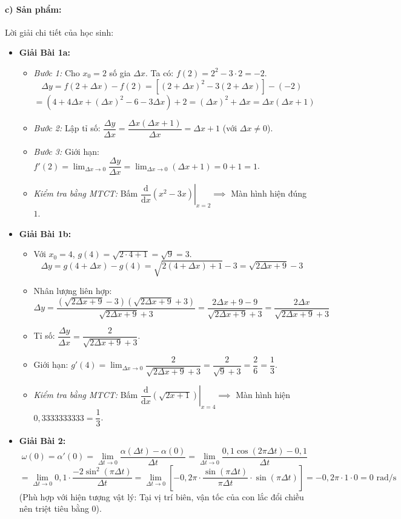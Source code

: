 \documentclass[12pt, a4paper]{article}
\begin{document}
\paragraph{c) Sản phẩm:} Lời giải chi tiết của học sinh:
\begin{itemize}[leftmargin=0.8cm]
    \item \textbf{Giải Bài 1a:}
    \begin{itemize}[leftmargin=0.4cm]
        \item \textit{Bước 1:} Cho $x_0 = 2$ số gia $\Delta x$. Ta có: $f(2) = 2^2 - 3 \cdot 2 = -2$.
        $$\Delta y = f(2 + \Delta x) - f(2) = \left[ (2 + \Delta x)^2 - 3(2 + \Delta x) \right] - (-2)$$
        $$= (4 + 4\Delta x + (\Delta x)^2 - 6 - 3\Delta x) + 2 = (\Delta x)^2 + \Delta x = \Delta x (\Delta x + 1)$$
        \item \textit{Bước 2:} Lập tỉ số: $\dfrac{\Delta y}{\Delta x} = \dfrac{\Delta x (\Delta x + 1)}{\Delta x} = \Delta x + 1$ (với $\Delta x \neq 0$).
        \item \textit{Bước 3:} Giới hạn: $f'(2) = \lim_{\Delta x \to 0} \dfrac{\Delta y}{\Delta x} = \lim_{\Delta x \to 0} (\Delta x + 1) = 0 + 1 = 1$.
        \item \textit{Kiểm tra bằng MTCT:} Bấm $\left. \dfrac{\mathrm{d}}{\mathrm{d}x} (x^2 - 3x) \right|_{x=2} \implies$ Màn hình hiện đúng $1$.
    \end{itemize}
    \item \textbf{Giải Bài 1b:}
    \begin{itemize}[leftmargin=0.4cm]
        \item Với $x_0 = 4$, $g(4) = \sqrt{2 \cdot 4 + 1} = \sqrt{9} = 3$.
        $$\Delta y = g(4 + \Delta x) - g(4) = \sqrt{2(4 + \Delta x) + 1} - 3 = \sqrt{2\Delta x + 9} - 3$$
        \item Nhân lượng liên hợp:
        $$\Delta y = \dfrac{(\sqrt{2\Delta x + 9} - 3)(\sqrt{2\Delta x + 9} + 3)}{\sqrt{2\Delta x + 9} + 3} = \dfrac{2\Delta x + 9 - 9}{\sqrt{2\Delta x + 9} + 3} = \dfrac{2\Delta x}{\sqrt{2\Delta x + 9} + 3}$$
        \item Tỉ số: $\dfrac{\Delta y}{\Delta x} = \dfrac{2}{\sqrt{2\Delta x + 9} + 3}$.
        \item Giới hạn: $g'(4) = \lim_{\Delta x \to 0} \dfrac{2}{\sqrt{2\Delta x + 9} + 3} = \dfrac{2}{\sqrt{9} + 3} = \dfrac{2}{6} = \dfrac{1}{3}$.
        \item \textit{Kiểm tra bằng MTCT:} Bấm $\left. \dfrac{\mathrm{d}}{\mathrm{d}x} (\sqrt{2x+1}) \right|_{x=4} \implies$ Màn hình hiện $0{,}3333333333 = \dfrac{1}{3}$.
    \end{itemize}
    \item \textbf{Giải Bài 2:}
    $$\omega(0) = \alpha'(0) = \lim_{\Delta t \to 0} \dfrac{\alpha(\Delta t) - \alpha(0)}{\Delta t} = \lim_{\Delta t \to 0} \dfrac{0{,}1 \cos(2\pi \Delta t) - 0{,}1}{\Delta t}$$
    $$= \lim_{\Delta t \to 0} 0{,}1 \cdot \dfrac{-2 \sin^2(\pi \Delta t)}{\Delta t} = \lim_{\Delta t \to 0} \left[ -0{,}2\pi \cdot \dfrac{\sin(\pi \Delta t)}{\pi \Delta t} \cdot \sin(\pi \Delta t) \right] = -0{,}2\pi \cdot 1 \cdot 0 = 0\text{ rad/s}$$
    (Phù hợp với hiện tượng vật lý: Tại vị trí biên, vận tốc của con lắc đổi chiều nên triệt tiêu bằng 0).
\end{itemize}
\end{document}

